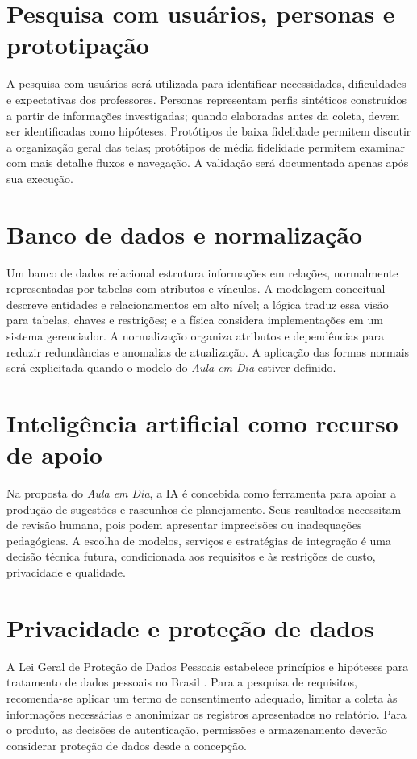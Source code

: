 \documentclass[12pt,a4paper,oneside]{report}
\begin{document}
\section{Pesquisa com usuários, personas e prototipação}
A pesquisa com usuários será utilizada para identificar necessidades, dificuldades e expectativas dos professores. Personas representam perfis sintéticos construídos a partir de informações investigadas; quando elaboradas antes da coleta, devem ser identificadas como hipóteses. Protótipos de baixa fidelidade permitem discutir a organização geral das telas; protótipos de média fidelidade permitem examinar com mais detalhe fluxos e navegação. A validação será documentada apenas após sua execução.

\section{Banco de dados e normalização}
Um banco de dados relacional estrutura informações em relações, normalmente representadas por tabelas com atributos e vínculos. A modelagem conceitual descreve entidades e relacionamentos em alto nível; a lógica traduz essa visão para tabelas, chaves e restrições; e a física considera implementações em um sistema gerenciador. A normalização organiza atributos e dependências para reduzir redundâncias e anomalias de atualização. A aplicação das formas normais será explicitada quando o modelo do \textit{Aula em Dia} estiver definido.

\section{Inteligência artificial como recurso de apoio}
Na proposta do \textit{Aula em Dia}, a IA é concebida como ferramenta para apoiar a produção de sugestões e rascunhos de planejamento. Seus resultados necessitam de revisão humana, pois podem apresentar imprecisões ou inadequações pedagógicas. A escolha de modelos, serviços e estratégias de integração é uma decisão técnica futura, condicionada aos requisitos e às restrições de custo, privacidade e qualidade.

\section{Privacidade e proteção de dados}
A Lei Geral de Proteção de Dados Pessoais estabelece princípios e hipóteses para tratamento de dados pessoais no Brasil \citep{brasil2018}. Para a pesquisa de requisitos, recomenda-se aplicar um termo de consentimento adequado, limitar a coleta às informações necessárias e anonimizar os registros apresentados no relatório. Para o produto, as decisões de autenticação, permissões e armazenamento deverão considerar proteção de dados desde a concepção.
\end{document}
